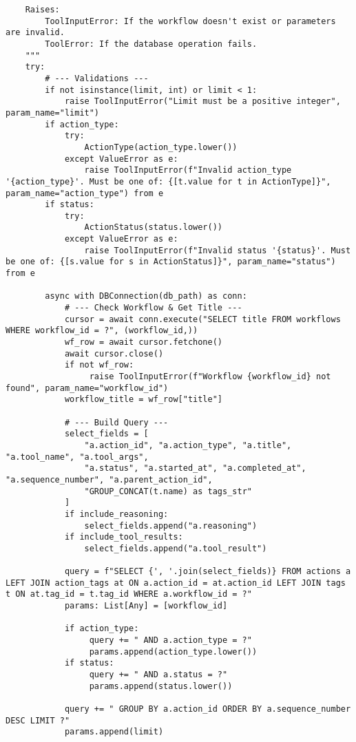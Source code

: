 \documentclass[12pt,a4paper]{article}
\begin{document}
\begin{pageablecode}
\begin{verbatim}
    Raises:
        ToolInputError: If the workflow doesn't exist or parameters are invalid.
        ToolError: If the database operation fails.
    """
    try:
        # --- Validations ---
        if not isinstance(limit, int) or limit < 1:
            raise ToolInputError("Limit must be a positive integer", param_name="limit")
        if action_type:
            try: 
                ActionType(action_type.lower())
            except ValueError as e: 
                raise ToolInputError(f"Invalid action_type '{action_type}'. Must be one of: {[t.value for t in ActionType]}", param_name="action_type") from e
        if status:
            try: 
                ActionStatus(status.lower())
            except ValueError as e: 
                raise ToolInputError(f"Invalid status '{status}'. Must be one of: {[s.value for s in ActionStatus]}", param_name="status") from e

        async with DBConnection(db_path) as conn:
            # --- Check Workflow & Get Title ---
            cursor = await conn.execute("SELECT title FROM workflows WHERE workflow_id = ?", (workflow_id,))
            wf_row = await cursor.fetchone()
            await cursor.close()
            if not wf_row:
                 raise ToolInputError(f"Workflow {workflow_id} not found", param_name="workflow_id")
            workflow_title = wf_row["title"]

            # --- Build Query ---
            select_fields = [
                "a.action_id", "a.action_type", "a.title", "a.tool_name", "a.tool_args",
                "a.status", "a.started_at", "a.completed_at", "a.sequence_number", "a.parent_action_id",
                "GROUP_CONCAT(t.name) as tags_str"
            ]
            if include_reasoning:
                select_fields.append("a.reasoning")
            if include_tool_results: 
                select_fields.append("a.tool_result")

            query = f"SELECT {', '.join(select_fields)} FROM actions a LEFT JOIN action_tags at ON a.action_id = at.action_id LEFT JOIN tags t ON at.tag_id = t.tag_id WHERE a.workflow_id = ?"
            params: List[Any] = [workflow_id]

            if action_type:
                 query += " AND a.action_type = ?"
                 params.append(action_type.lower())
            if status:
                 query += " AND a.status = ?"
                 params.append(status.lower())

            query += " GROUP BY a.action_id ORDER BY a.sequence_number DESC LIMIT ?"
            params.append(limit)


\end{verbatim}
\end{pageablecode}
\end{document}
